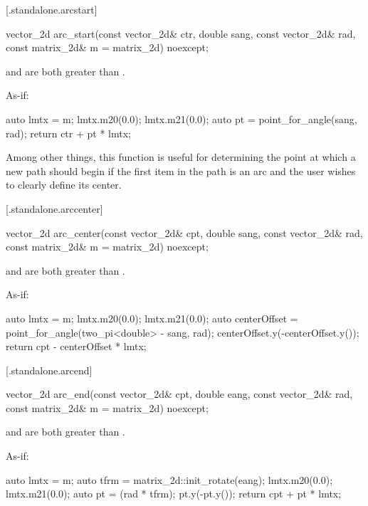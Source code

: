  [\iotwod.standalone.arcstart] {}

%
\begin{itemdecl}
vector_2d arc_start(const vector_2d& ctr, double sang, const vector_2d& rad, 
  const matrix_2d& m = matrix_2d{}) noexcept;
\end{itemdecl}
\begin{itemdescr}
\pnum
\requires
{} and  are both greater than .

\pnum
\returns
As-if:
\begin{codeblock}
auto lmtx = m;
lmtx.m20(0.0); lmtx.m21(0.0);
auto pt = point_for_angle(sang, rad);
return ctr + pt * lmtx;
\end{codeblock}

\pnum
\begin{note}
Among other things, this function is useful for determining the point at which a new path should begin if the first item in the path is an arc and the user wishes to clearly define its center.
\end{note}
\end{itemdescr}

 [\iotwod.standalone.arccenter] {}

%
\begin{itemdecl}
vector_2d arc_center(const vector_2d& cpt, double sang, const vector_2d& rad, 
  const matrix_2d& m = matrix_2d{}) noexcept;
\end{itemdecl}
\begin{itemdescr}
\pnum
\requires
{} and  are both greater than .

\pnum
\returns
As-if:
\begin{codeblock}
auto lmtx = m;
lmtx.m20(0.0); lmtx.m21(0.0);
auto centerOffset = point_for_angle(two_pi<double> - sang, rad);
centerOffset.y(-centerOffset.y());
return cpt - centerOffset * lmtx;
\end{codeblock}
\end{itemdescr}

 [\iotwod.standalone.arcend] {}

%
\begin{itemdecl}
vector_2d arc_end(const vector_2d& cpt, double eang, const vector_2d& rad, 
  const matrix_2d& m = matrix_2d{}) noexcept;
\end{itemdecl}
\begin{itemdescr}
\pnum
\requires
{} and  are both greater than .

\pnum
\returns
As-if:
\begin{codeblock}
auto lmtx = m;
auto tfrm = matrix_2d::init_rotate(eang);
lmtx.m20(0.0); lmtx.m21(0.0);
auto pt = (rad * tfrm);
pt.y(-pt.y());
return cpt + pt * lmtx;
\end{codeblock}
\end{itemdescr}
